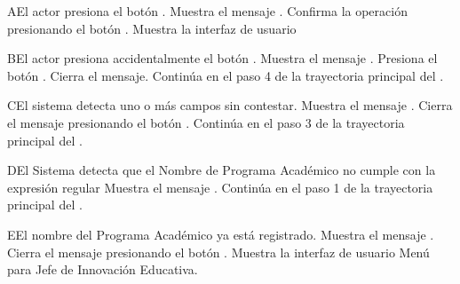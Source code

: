 \begin{UCtrayectoriaA}{A}{El actor presiona el botón .}
    \UCpaso Muestra el mensaje .
    \UCpaso[\UCactor] Confirma la operación presionando el botón .
    \UCpaso Muestra la interfaz de usuario 
\end{UCtrayectoriaA}
\begin{UCtrayectoriaA}{B}{El actor presiona accidentalmente el botón .}
    \UCpaso Muestra el mensaje .
    \UCpaso[\UCactor] Presiona el botón .
    \UCpaso Cierra el mensaje.
    \UCpaso Continúa en el paso 4 de la trayectoria principal del .
\end{UCtrayectoriaA}
\begin{UCtrayectoriaA}{C}{El sistema detecta uno o más campos sin contestar.}
    \UCpaso Muestra el mensaje .
    \UCpaso[\UCactor] Cierra el mensaje presionando el botón .
    \UCpaso Continúa en el paso 3 de la trayectoria principal del .
\end{UCtrayectoriaA}
\begin{UCtrayectoriaA}{D}{El Sistema detecta que el Nombre de Programa Académico no cumple con la expresión regular}
    \UCpaso Muestra el mensaje .
    \UCpaso Continúa en el paso 1 de la trayectoria principal del .
\end{UCtrayectoriaA}

\begin{UCtrayectoriaA}{E}{El nombre del Programa Académico ya está registrado.}
    \UCpaso Muestra el mensaje .
    \UCpaso[\UCactor] Cierra el mensaje presionando el botón .
\UCpaso Muestra la interfaz de usuario Menú para Jefe de Innovación Educativa.
\end{UCtrayectoriaA}

